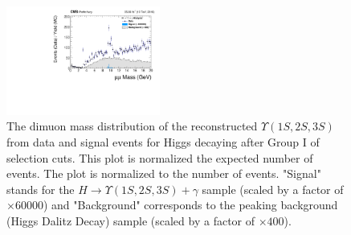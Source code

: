 \begin{figure}[!htbp]
\begin{center}
\includegraphics[width=0.45\textwidth]{figures_and_tables/outputPlots/HtoUpsilon_Cat0_ZZZZZ/nEvts/data_x_mc/noKinCuts/h_noKin_Upsilon_Mass_Signal_and_Background_LargeRange}\hspace*{1.cm}
\end{center}\vspace*{-.5cm}
\caption{The dimuon mass distribution of the reconstructed $\Upsilon (1S,2S,3S)$ from data and signal events for Higgs decaying after Group I of selection cuts. This plot is normalized the expected number of events.  The plot is normalized to the number of events. "Signal" stands for the $H \rightarrow \Upsilon (1S,2S,3S) + \gamma$ sample (scaled by a factor of $\times 60000$) and "Background" corresponds to the peaking background (Higgs Dalitz Decay) sample (scaled by a factor of $\times 400$).}
\label{fig:dimuon_mass_HtoUpsilon_Cat0}
\end{figure}

